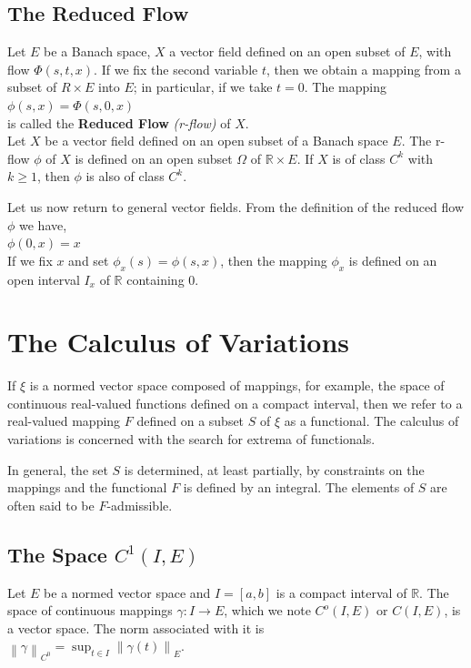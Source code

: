 \documentclass[12 pt]{article}
\theoremstyle{definition}
\theoremstyle{remark}
\newcommand{\R}{\mathbb{R}}
\newcommand\norm[1]{\left\lVert#1\right\rVert}
\begin{document}
{\subsection{The Reduced Flow}
Let $E$ be a Banach space, $X$ a vector field defined on an open subset of $E$, with flow $\Phi(s,t,x)$. If we fix the second variable $t$, then we obtain a mapping from a subset of $R \times E$ into $E$; in particular, if we take $t = 0$. The mapping\\
\hspace*{5cm} $\phi(s,x) = \Phi(s,0,x)$\\
is called the \textbf{Reduced Flow} \textit{(r-flow)} of $X$.\\

\theorem Let $X$ be a vector field defined on an open subset of a Banach space
$E$. The r-flow $\phi$ of $X$ is defined on an open subset $\Omega$ of $\R \times E$. If $X$ is of class $C^k$ with $k \geq 1$, then $\phi$ is also of class $C^k$.\\
\normalfont

Let us now return to general vector fields. From the definition of the reduced flow
$\phi$ we have,\\
\hspace*{4cm} $\phi (0, x) = x$\\

If we fix $x$ and set $\phi_x (s) = \phi(s,x)$, then the mapping $\phi_x$ is defined on an open interval $I_x$ of $\R$ containing $0$.

\section{The Calculus of Variations}
If $\xi$ is a normed vector space composed of mappings, for example, the space of
continuous real-valued functions defined on a compact interval, then we refer to a
real-valued mapping $F$ defined on a subset $S$ of $\xi$ as a functional. The calculus of variations is concerned with the search for extrema of functionals.

In general, the set $S$ is determined, at least partially, by constraints on the mappings and the functional $F$ is defined by an integral. The elements of $S$ are often said to be $F$-admissible.

\subsection{The Space $C^1(I,E)$}
Let $E$ be a normed vector space and $I = [a,b]$ is a compact interval of $\R$. The space of continuous mappings $\gamma : I \to E$, which we note $C^o(I,E)$ or $C(I,E)$, is a vector space. The norm associated with it is\\
\hspace*{4cm} $\norm{\gamma}_{C^0} = \sup_{t \in I} \norm{\gamma (t)}_E $.

}
\end{document}
